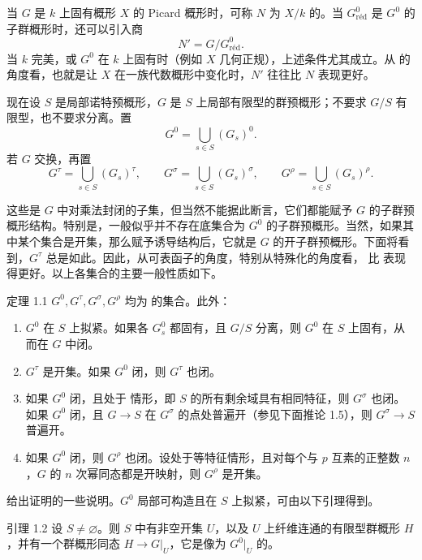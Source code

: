 当 $G$ 是 $k$ 上固有概形 $X$ 的 Picard 概形时，可称 $N$ 为 $X/k$ 的。当 $G^0_{\text{réd}}$ 是 $G^0$ 的子群概形时，还可以引入商
\[
 N'=G/G^0_{\text{réd}}.
\]
当 $k$ 完美，或 $G^0$ 在 $k$ 上固有时（例如 $X$ 几何正规），上述条件尤其成立。从 的角度看，也就是让 $X$ 在一族代数概形中变化时，$N'$ 往往比 $N$ 表现更好。

现在设 $S$ 是局部诺特预概形，$G$ 是 $S$ 上局部有限型的群预概形；不要求 $G/S$ 有限型，也不要求分离。置
\[
 G^0=\bigcup_{s\in S}(G_s)^0.
\]
若 $G$ 交换，再置
\[
 G^\tau=\bigcup_{s\in S}(G_s)^\tau,\qquad
 G^\sigma=\bigcup_{s\in S}(G_s)^\sigma,\qquad
 G^\rho=\bigcup_{s\in S}(G_s)^\rho.
\]

这些是 $G$ 中对乘法封闭的子集，但当然不能据此断言，它们都能赋予 $G$ 的子群预概形结构。特别是，一般似乎并不存在底集合为 $G^0$ 的子群预概形。当然，如果其中某个集合是开集，那么赋予诱导结构后，它就是 $G$ 的开子群预概形。下面将看到，$G^\tau$ 总是如此。因此，从可表函子的角度，特别从特殊化的角度看， 比 表现得更好。以上各集合的主要一般性质如下。

\begin{statement}{定理 1.1}
$G^0,G^\tau,G^\sigma,G^\rho$ 均为 的集合。此外：
\begin{enumerate}
\item[(i)] $G^0$ 在 $S$ 上拟紧。如果各 $G_s^0$ 都固有，且 $G/S$ 分离，则 $G^0$ 在 $S$ 上固有，从而在 $G$ 中闭。
\item[(ii)] $G^\tau$ 是开集。如果 $G^0$ 闭，则 $G^\tau$ 也闭。
\item[(iii)] 如果 $G^0$ 闭，且处于 情形，即 $S$ 的所有剩余域具有相同特征，则 $G^\sigma$ 也闭。如果 $G^0$ 闭，且 $G\to S$ 在 $G^\sigma$ 的点处普遍开（参见下面推论 1.5），则 $G^\sigma\to S$ 普遍开。
\item[(iv)] 如果 $G^0$ 闭，则 $G^\rho$ 也闭。设处于等特征情形，且对每个与 $p$ 互素的正整数 $n$，$G$ 的 $n$ 次幂同态都是开映射，则 $G^\rho$ 是开集。
\end{enumerate}
\end{statement}

给出证明的一些说明。$G^0$ 局部可构造且在 $S$ 上拟紧，可由以下引理得到。

\begin{statement}{引理 1.2}
设 $S\ne\varnothing$。则 $S$ 中有非空开集 $U$，以及 $U$ 上纤维连通的有限型群概形 $H$，并有一个群概形同态 $H\to G|_U$，它是像为 $G^0|_U$ 的。
\end{statement}

